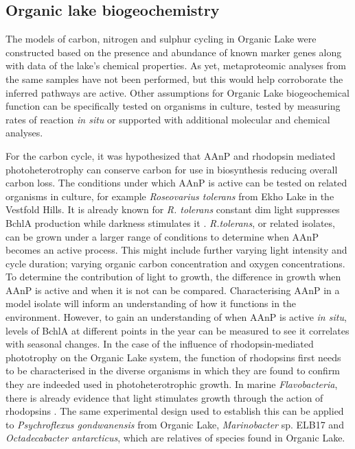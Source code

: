 \subsection{Organic lake biogeochemistry}
The models of carbon, nitrogen and sulphur cycling in Organic Lake were constructed based on the presence and abundance of known marker genes  along with data of the lake's chemical properties.
As yet, metaproteomic analyses from the same samples have not been performed, but this would help corroborate the inferred pathways are active. 
Other assumptions for Organic Lake biogeochemical function can be specifically tested on organisms in culture, tested by measuring rates of reaction \emph{in situ} or supported with additional molecular and chemical analyses.

For the carbon cycle, it was hypothesized that \ac{AAnP} and rhodopsin mediated photoheterotrophy can conserve carbon for use in biosynthesis  reducing overall carbon loss.
The conditions under which \ac{AAnP} is active can be tested on related organisms in culture, for example \emph{Roseovarius tolerans} from Ekho Lake in the Vestfold Hills. 
It is already known for \emph{R. tolerans} constant dim light suppresses \ac{BchlA} production while darkness stimulates it \cite{Labrenz1999}.
\emph{R.tolerans}, or related isolates, can be grown under a larger range of conditions to determine when \ac{AAnP} becomes an active process.
This might include further varying light intensity and cycle duration; varying organic carbon concentration and oxygen concentrations.
To determine the contribution of light to growth, the difference in growth when \ac{AAnP} is active and when it is not can be compared.
Characterising \ac{AAnP} in a model isolate will inform an understanding of how it functions in the environment.
However, to gain an understanding of when \ac{AAnP} is active \emph{in situ}, levels of \ac{BchlA} at different points in the year can be measured to see it correlates with seasonal changes.
In the case of the influence of rhodopsin-mediated phototrophy on the Organic Lake system, the function of rhodopsins first needs to be characterised in the diverse organisms in which they are found to confirm they are indeeded used in photoheterotrophic growth.
In marine \emph{Flavobacteria}, there is already evidence that light stimulates growth through the action of rhodopsins \cite{Gomez-Consarnau2007}.
The same experimental design used to establish this can be applied to \emph{Psychroflexus gondwanensis} from Organic Lake, \emph{Marinobacter} sp. ELB17 and \emph{Octadecabacter antarcticus}, which are relatives of species found in Organic Lake.

